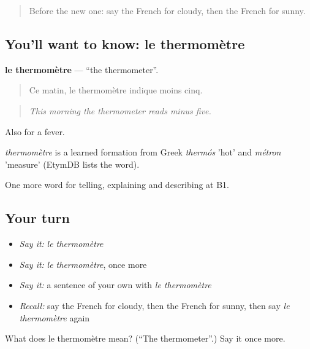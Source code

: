 \label{lesson:FR-C460-thermometre}



\begin{quote}
Before the new one: say the French for cloudy, then the French for sunny.
\end{quote}

\subsection*{You'll want to know: le thermomètre}
\textbf{le thermomètre} — \textquotedblleft{}the thermometer\textquotedblright{}.

\begin{quote}
Ce matin, le thermomètre indique moins cinq.
\end{quote}

\begin{quote}
\emph{This morning the thermometer reads minus five.}
\end{quote}

Also for a fever.

\begin{cousinweb}
\emph{thermomètre} is a learned formation from Greek \emph{thermós} 'hot' and \emph{métron} 'measure' (EtymDB lists the word).
\end{cousinweb}

\begin{grammarlens}[title={What you've built}]
One more word for telling, explaining and describing at B1.
\end{grammarlens}

\subsection*{Your turn}
\begin{itemize}
\raggedright
  \item \emph{Say it:} \emph{le thermomètre}
  \item \emph{Say it:} \emph{le thermomètre}, once more
  \item \emph{Say it:} a sentence of your own with \emph{le thermomètre}
  \item \emph{Recall:} say the French for cloudy, then the French for sunny, then say \emph{le thermomètre} again
\end{itemize}

\begin{tcolorbox}[breakable,colback=teal!4,colframe=teal!35!black,title={Before you move on}]
What does le thermomètre mean? (\textquotedblleft{}The thermometer\textquotedblright{}.) Say it once more.
\end{tcolorbox}
